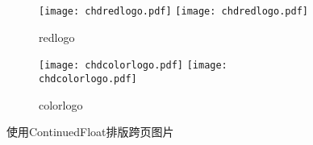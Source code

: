 \begin{figure}[t]
  \centering
  \ContinuedFloat
  \begin{subfigure}{\linewidth}
    \centering
    \texttt{[image: chdredlogo.pdf]}
    \hspace{1cm}
    \texttt{[image: chdredlogo.pdf]}
    \caption{redlogo}
  \end{subfigure}
  \begin{subfigure}{\linewidth}
    \centering
    \texttt{[image: chdcolorlogo.pdf]}
    \hspace{1cm}
    \texttt{[image: chdcolorlogo.pdf]}
    \caption{colorlogo}
  \end{subfigure}
  \caption{使用\textsf{ContinuedFloat}排版跨页图片\label{fig:cross}}
\end{figure}

\mbox{}